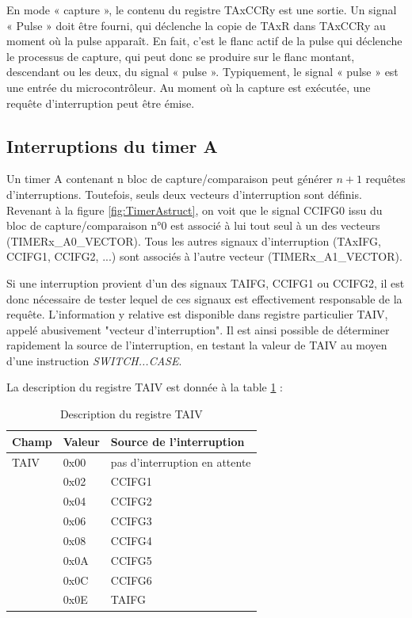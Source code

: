 En mode « capture », le contenu du registre TAxCCRy est une sortie. Un signal « Pulse » doit être fourni, qui déclenche la copie de TAxR dans TAxCCRy au moment où la pulse apparaît. En fait, c'est le flanc actif de la pulse qui déclenche le processus de capture, qui peut donc se produire sur le flanc montant, descendant ou les deux, du signal « pulse ». Typiquement, le signal « pulse » est une entrée du microcontrôleur. Au moment où la capture est exécutée, une requête d'interruption peut être émise.

\subsection{Interruptions du timer A}
Un timer A contenant n bloc de capture/comparaison peut générer $n+1$ requêtes d'interruptions. Toutefois, seuls deux vecteurs d'interruption sont définis. 
Revenant à la figure \ref{fig:TimerAstruct}, on voit que le signal CCIFG0 issu du bloc de capture/comparaison n°0 est associé à lui tout seul à un des vecteurs (TIMERx\_A0\_VECTOR). Tous les autres signaux d'interruption (TAxIFG, CCIFG1, CCIFG2, ...) sont associés à l'autre vecteur (TIMERx\_A1\_VECTOR).

Si une interruption provient d'un des signaux TAIFG, CCIFG1 ou CCIFG2, il est donc nécessaire de tester lequel de ces signaux est effectivement responsable de la requête. L'information y relative est disponible dans registre particulier TAIV, appelé abusivement "vecteur d'interruption". Il est ainsi possible de déterminer rapidement la source de l'interruption, en testant la valeur de TAIV au moyen d'une instruction \textit{SWITCH...CASE}.

La description du registre TAIV est donnée à la table \ref{table:TAIV} :
\begin{table}[htb]
\centering 
\begin{tabular}{l l l}
\hline\hline
Champ & Valeur & Source de l'interruption \\ %
\hline                  %
TAIV & 0x00 & pas d'interruption en attente  \\	%
& 0x02 & CCIFG1  \\
& 0x04 & CCIFG2  \\
& 0x06 & CCIFG3  \\
& 0x08 & CCIFG4  \\
& 0x0A & CCIFG5  \\
& 0x0C & CCIFG6  \\
& 0x0E & TAIFG  \\ [1ex]      %
\hline
\end{tabular}
\caption{Description du registre TAIV}
\label{table:TAIV}
\end{table}

